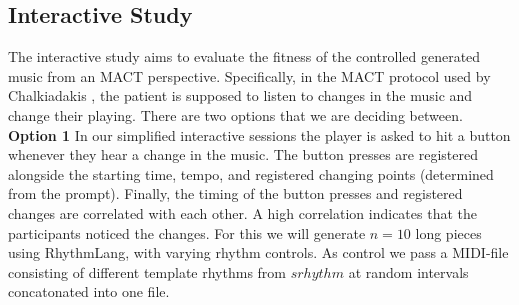 \subsection{Interactive Study}
The interactive study aims to evaluate the fitness of the controlled generated music from an MACT perspective. Specifically, in the MACT protocol used by Chalkiadakis \cite{Chalkiadakis_2022}, the patient is supposed to listen to changes in the music and change their playing. There are two options that we are deciding between.
\textbf{Option 1}
In our simplified interactive sessions the player is asked to hit a button whenever they hear a change in the music. The button presses are registered alongside the starting time, tempo, and registered changing points (determined from the prompt). Finally, the timing of the button presses and registered changes are correlated with each other. A high correlation indicates that the participants noticed the changes. 
For this we will generate $n=10$ long pieces using RhythmLang, with varying rhythm controls. As control we pass a MIDI-file consisting of different template rhythms from $srhythm$ at random intervals concatonated into one file.   
